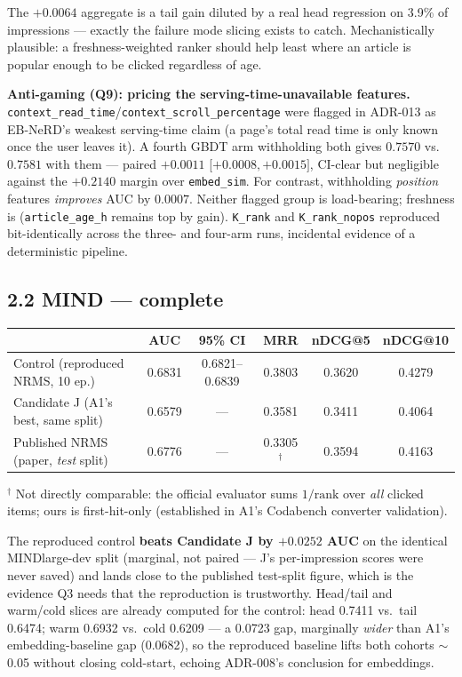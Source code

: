 \documentclass[11pt]{article}
\begin{document}
The $+0.0064$ aggregate is a tail gain diluted by a real head regression on 3.9\%
of impressions --- exactly the failure mode slicing exists to catch. Mechanistically
plausible: a freshness-weighted ranker should help least where an article is
popular enough to be clicked regardless of age.

\textbf{Anti-gaming (Q9): pricing the serving-time-unavailable features.}
\texttt{context\_read\_time}/\allowbreak\texttt{context\_scroll\_percentage} were flagged in
ADR-013 as EB-NeRD's weakest serving-time claim (a page's total read time is only
known once the user leaves it). A fourth GBDT arm withholding both gives
$0.7570$ vs.\ $0.7581$ with them --- paired $+0.0011$ [$+0.0008,+0.0015]$, CI-clear
but negligible against the $+0.2140$ margin over \texttt{embed\_sim}. For contrast,
withholding \emph{position} features \emph{improves} AUC by $0.0007$. Neither
flagged group is load-bearing; freshness is (\texttt{article\_age\_h} remains top
by gain). \texttt{K\_rank} and \texttt{K\_rank\_nopos} reproduced bit-identically
across the three- and four-arm runs, incidental evidence of a deterministic pipeline.

\subsection*{2.2 MIND --- complete}

\begin{center}
{\footnotesize
\begin{tabular}{@{}lccccc@{}}
\toprule
& AUC & 95\% CI & MRR & nDCG@5 & nDCG@10 \\
\midrule
Control (reproduced NRMS, 10 ep.) & 0.6831 & 0.6821--0.6839 & 0.3803 & 0.3620 & 0.4279 \\
Candidate J (A1's best, same split) & 0.6579 & --- & 0.3581 & 0.3411 & 0.4064 \\
Published NRMS (paper, \emph{test} split) & 0.6776 & --- & 0.3305$^\dagger$ & 0.3594 & 0.4163 \\
\bottomrule
\end{tabular}\par}
\end{center}
$^\dagger$ Not directly comparable: the official evaluator sums $1/\text{rank}$ over
\emph{all} clicked items; ours is first-hit-only (established in A1's Codabench
converter validation).

The reproduced control \textbf{beats Candidate J by $+0.0252$ AUC} on the identical
MINDlarge-dev split (marginal, not paired --- J's per-impression scores were never
saved) and lands close to the published test-split figure, which is the evidence
Q3 needs that the reproduction is trustworthy. Head/tail and warm/cold slices are
already computed for the control: head 0.7411 vs.\ tail 0.6474; warm 0.6932 vs.\
cold 0.6209 --- a 0.0723 gap, marginally \emph{wider} than A1's embedding-baseline
gap (0.0682), so the reproduced baseline lifts both cohorts $\sim$0.05 without
closing cold-start, echoing ADR-008's conclusion for embeddings.
\end{document}
